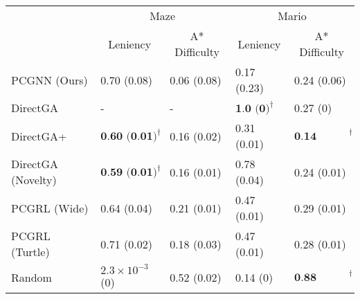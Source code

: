 \begin{tabular}{lllll}
\toprule
{} & \multicolumn{2}{c}{Maze} & \multicolumn{2}{c}{Mario} \\
{} & \multicolumn{1}{c}{Leniency} & \multicolumn{1}{c}{A* Difficulty} & \multicolumn{1}{c}{Leniency} & \multicolumn{1}{c}{A* Difficulty }\\
\midrule
PCGNN (Ours)       &                       0.70 (0.08) &   0.06 (0.08) &                   0.17 (0.23) &                       0.24 (0.06) \\
DirectGA           &                                 - &             - &  $\textbf{1.0 (0)}^{\dagger}$ &                          0.27 (0) \\
DirectGA+          &  $\textbf{0.60 (0.01)}^{\dagger}$ &   0.16 (0.02) &                   0.31 (0.01) &  $\textbf{0.14 (0.01)}^{\dagger}$ \\
DirectGA (Novelty) &  $\textbf{0.59 (0.01)}^{\dagger}$ &   0.16 (0.01) &                   0.78 (0.04) &                       0.24 (0.01) \\
PCGRL (Wide)       &                       0.64 (0.04) &   0.21 (0.01) &                   0.47 (0.01) &                       0.29 (0.01) \\
PCGRL (Turtle)     &                       0.71 (0.02) &   0.18 (0.03) &                   0.47 (0.01) &                       0.28 (0.01) \\
Random             &          $2.3 \times 10^{-3}$ (0) &   0.52 (0.02) &                      0.14 (0) &  $\textbf{0.88 (0.02)}^{\dagger}$ \\
\bottomrule
\end{tabular}

